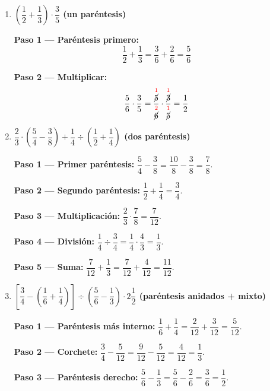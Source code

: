 \documentclass[11pt, letterpaper]{article}
\begin{document}
\begin{tcolorbox}[examplebox, title={Ejemplos con s\'imbolos de agrupaci\'on (dificultad creciente)}]
\begin{enumerate}[label=\textbf{Ej. \arabic*.}, leftmargin=*, itemsep=20pt]

\item \textbf{$\left(\dfrac{1}{2}+\dfrac{1}{3}\right)\cdot\dfrac{3}{5}$ \quad (un par\'entesis)}

\textbf{Paso 1 --- Par\'entesis primero:}
$$\frac{1}{2}+\frac{1}{3} = \frac{3}{6}+\frac{2}{6} = \frac{5}{6}$$

\textbf{Paso 2 --- Multiplicar:}
$$\frac{5}{6} \cdot \frac{3}{5} = \frac{\overset{\textcolor{red}{1}}{\cancel{5}}}{\overset{\textcolor{red}{2}}{\cancel{6}}} \cdot \frac{\overset{\textcolor{red}{1}}{\cancel{3}}}{\overset{\textcolor{red}{1}}{\cancel{5}}} = \frac{1}{2}$$

\item \textbf{$\dfrac{2}{3}\cdot\left(\dfrac{5}{4}-\dfrac{3}{8}\right) + \dfrac{1}{4}\div\left(\dfrac{1}{2}+\dfrac{1}{4}\right)$ \quad (dos par\'entesis)}

\textbf{Paso 1 --- Primer par\'entesis:} $\dfrac{5}{4}-\dfrac{3}{8}=\dfrac{10}{8}-\dfrac{3}{8}=\dfrac{7}{8}$.

\textbf{Paso 2 --- Segundo par\'entesis:} $\dfrac{1}{2}+\dfrac{1}{4}=\dfrac{3}{4}$.

\textbf{Paso 3 --- Multiplicaci\'on:} $\dfrac{2}{3}\cdot\dfrac{7}{8}=\dfrac{7}{12}$.

\textbf{Paso 4 --- Divisi\'on:} $\dfrac{1}{4}\div\dfrac{3}{4}=\dfrac{1}{4}\cdot\dfrac{4}{3}=\dfrac{1}{3}$.

\textbf{Paso 5 --- Suma:} $\dfrac{7}{12}+\dfrac{1}{3}=\dfrac{7}{12}+\dfrac{4}{12}=\dfrac{11}{12}$.

\item \textbf{$\left[\dfrac{3}{4}-\left(\dfrac{1}{6}+\dfrac{1}{4}\right)\right]\div\left(\dfrac{5}{6}-\dfrac{1}{3}\right)\cdot2\dfrac{1}{2}$ \quad (par\'entesis anidados + mixto)}

\textbf{Paso 1 --- Par\'entesis m\'as interno:} $\dfrac{1}{6}+\dfrac{1}{4}=\dfrac{2}{12}+\dfrac{3}{12}=\dfrac{5}{12}$.

\textbf{Paso 2 --- Corchete:} $\dfrac{3}{4}-\dfrac{5}{12}=\dfrac{9}{12}-\dfrac{5}{12}=\dfrac{4}{12}=\dfrac{1}{3}$.

\textbf{Paso 3 --- Par\'entesis derecho:} $\dfrac{5}{6}-\dfrac{1}{3}=\dfrac{5}{6}-\dfrac{2}{6}=\dfrac{3}{6}=\dfrac{1}{2}$.


\end{enumerate}
\end{tcolorbox}
\end{document}
